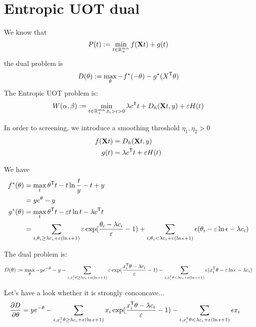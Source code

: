 
\section{Entropic UOT dual}
We know that 
\begin{equation}
P(t):= \min_{t \in \mathbb{R}_{+}^{mn}} f(\mathbf{X} t) + g(t)
\end{equation}
the dual problem is 
\begin{equation}
D(\theta) := \max_{\theta} -f^*(-\theta) - g^*(X^{\mathsf T}\theta)
\end{equation}
The Entropic UOT problem is:
\begin{equation}
\label{eq:euot}
W(\alpha,\beta) := \min_{t \in \mathbb{R}_{+}^{mn}, t_i>\epsilon>0} \lambda c^{\mathsf T}t + D_h(\mathbf{X}t,y) + \varepsilon H(t)
\end{equation}

In order to screening, we introduce a smoothing threshold $\eta_1,\eta_2 > 0$ 
$$
\begin{aligned}
f(\mathbf{X} t) &=  D_h(\mathbf{X}t,y) \\
g(t) &= \lambda c^{\mathsf T} t + \varepsilon H(t)
\end{aligned}
$$

We have 
$$
\begin{aligned}
f^{*}(\theta) &= \max_t \theta^{\mathsf T} t - t\ln \frac{t}{y} - t+y\\
&=ye^{\theta} - y\\
g^{*}(\theta) &= \max_t \theta^{\mathsf T} t - \varepsilon t\ln t - \lambda c^{\mathsf T}t\\
&= \sum_{i,\theta_i\geq\lambda c_i +\varepsilon(\ln \epsilon + 1)} \varepsilon \exp(\frac{\theta_i-\lambda c_i}{\varepsilon}-1)+\sum_{i,\theta_i<\lambda c_i +\varepsilon(\ln \epsilon + 1)} \epsilon(\theta_i - \varepsilon\ln\epsilon-\lambda c_i)
\end{aligned}
$$

The dual problem is:
\begin{equation}
\label{eq:reuot}
D(\theta) := \max_{\theta} -ye^{-\theta} - y - \sum_{i,x_i^{\mathsf T}\theta\geq\lambda c_i +\varepsilon(\ln \epsilon + 1)} \varepsilon \exp(\frac{x_i^{\mathsf T}\theta-\lambda c_i}{\varepsilon}-1) - \sum_{i,x_i^{\mathsf T}\theta<\lambda c_i +\varepsilon(\ln \epsilon + 1)} \epsilon(x_i^{\mathsf T}\theta - \varepsilon\ln\epsilon-\lambda c_i)
\end{equation}

Let's have a look whether it is strongly conconcave...
$$
\begin{aligned}
\frac{\partial D}{\partial \theta} &=  ye^{-\theta} -  \sum_{i,x_i^{\mathsf T}\theta\geq\lambda c_i +\varepsilon(\ln \epsilon + 1)} x_i\exp(\frac{x_i^{\mathsf T}\theta-\lambda c_i}{\varepsilon}-1) -\sum_{i,x_i^{\mathsf T}\theta<\lambda c_i +\varepsilon(\ln \epsilon + 1)} \epsilon x_i
\end{aligned}
$$

